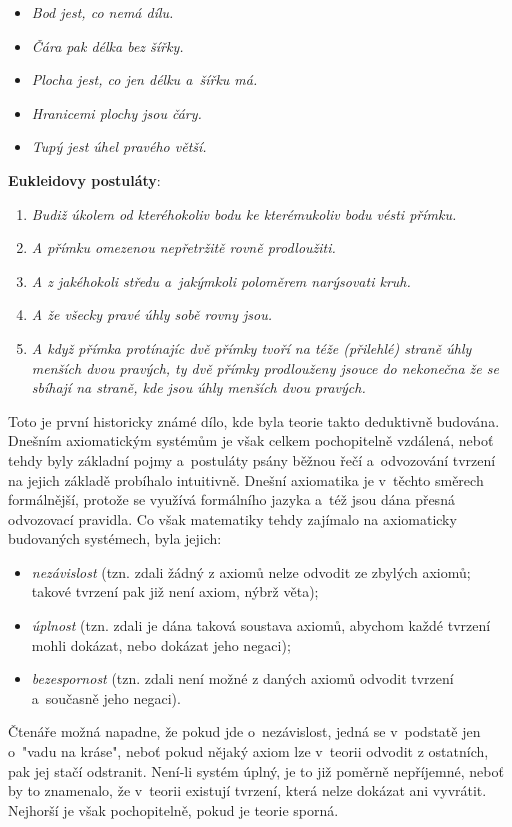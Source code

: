 \begin{itemize}
\item \textit{Bod jest, co nemá dílu.}
\item \textit{Čára pak délka bez šířky.}
\item \textit{Plocha jest, co jen délku a~šířku má.}
\item \textit{Hranicemi plochy jsou čáry.}
\item \textit{Tupý jest úhel pravého větší.}
\end{itemize}
\noindent \textbf{Eukleidovy postuláty}:
\begin{enumerate}[label=({E}\arabic*)]
\item \textit{Budiž úkolem od kteréhokoliv bodu ke kterémukoliv bodu vésti přímku.}
\item \textit{A přímku omezenou nepřetržitě rovně prodloužiti.}
\item \textit{A z jakéhokoli středu a~jakýmkoli poloměrem narýsovati kruh.}
\item \textit{A že všecky pravé úhly sobě rovny jsou.}
\item \textit{A když přímka protínajíc dvě přímky tvoří na téže (přilehlé) straně úhly menších dvou pravých, ty dvě přímky prodlouženy jsouce do nekonečna že se sbíhají na straně, kde jsou úhly menších dvou pravých.}
\end{enumerate}
Toto je první historicky známé dílo, kde byla teorie takto deduktivně budována. Dnešním axiomatickým systémům je však celkem pochopitelně vzdálená, neboť tehdy byly základní pojmy a~postuláty psány běžnou řečí a~odvozování tvrzení na jejich základě probíhalo intuitivně. Dnešní axiomatika je v~těchto směrech formálnější, protože se využívá formálního jazyka a~též jsou dána přesná odvozovací pravidla. Co však matematiky tehdy zajímalo na axiomaticky budovaných systémech, byla jejich:
\begin{itemize}
\item \emph{nezávislost} (tzn. zdali žádný z axiomů nelze odvodit ze zbylých axiomů; takové tvrzení pak již není axiom, nýbrž věta);
\item \emph{úplnost} (tzn. zdali je dána taková soustava axiomů, abychom každé tvrzení mohli dokázat, nebo dokázat jeho negaci);
\item \emph{bezespornost} (tzn. zdali není možné z daných axiomů odvodit tvrzení a~současně jeho negaci).
\end{itemize}
Čtenáře možná napadne, že pokud jde o~nezávislost, jedná se v~podstatě jen o~"vadu na kráse", neboť pokud nějaký axiom lze v~teorii odvodit z ostatních, pak jej stačí odstranit. Není-li systém úplný, je to již poměrně nepříjemné, neboť by to znamenalo, že v~teorii existují tvrzení, která nelze dokázat ani vyvrátit. Nejhorší je však pochopitelně, pokud je teorie sporná.

